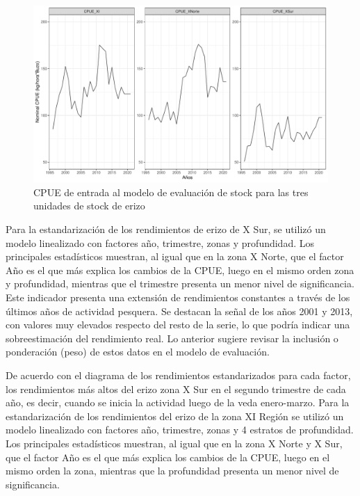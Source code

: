 \documentclass[
]{article}
\begin{document}
\begin{figure}

{\centering \includegraphics{Figuras/datInd2-1} 

}

\caption{CPUE de entrada al modelo de evaluación de stock para las tres unidades de stock de erizo}\label{fig:datInd2}
\end{figure}

Para la estandarización de los rendimientos de erizo de X Sur, se
utilizó un modelo linealizado con factores año, trimestre, zonas y
profundidad. Los principales estadísticos muestran, al igual que en la
zona X Norte, que el factor Año es el que más explica los cambios de la
CPUE, luego en el mismo orden zona y profundidad, mientras que el
trimestre presenta un menor nivel de significancia. Este indicador
presenta una extensión de rendimientos constantes a través de los
últimos años de actividad pesquera. Se destacan la señal de los años
2001 y 2013, con valores muy elevados respecto del resto de la serie, lo
que podría indicar una sobreestimación del rendimiento real. Lo anterior
sugiere revisar la inclusión o ponderación (peso) de estos datos en el
modelo de evaluación.

De acuerdo con el diagrama de los rendimientos estandarizados para cada
factor, los rendimientos más altos del erizo zona X Sur en el segundo
trimestre de cada año, es decir, cuando se inicia la actividad luego de
la veda enero-marzo. Para la estandarización de los rendimientos del
erizo de la zona XI Región se utilizó un modelo linealizado con factores
año, trimestre, zonas y 4 estratos de profundidad. Los principales
estadísticos muestran, al igual que en la zona X Norte y X Sur, que el
factor Año es el que más explica los cambios de la CPUE, luego en el
mismo orden la zona, mientras que la profundidad presenta un menor nivel
de significancia.
\end{document}
